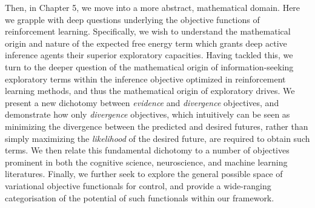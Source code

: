 Then, in Chapter 5, we move into a more abstract, mathematical domain. Here we grapple with deep questions underlying the objective functions of reinforcement learning. Specifically, we wish to understand the mathematical origin and nature of the expected free energy term which grants deep active inference agents their superior exploratory capacities. Having tackled this, we turn to the deeper question of the mathematical origin of information-seeking exploratory terms within the inference objective optimized in reinforcement learning methods, and thus the mathematical origin of exploratory drives. We present a new dichotomy between \emph{evidence} and \emph{divergence} objectives, and demonstrate how only \emph{divergence} objectives, which intuitively can be seen as minimizing the divergence between the predicted and desired futures, rather than simply maximizing the \emph{likelihood} of the desired future, are required to obtain such terms. We then relate this fundamental dichotomy to a number of objectives prominent in both the cognitive science, neuroscience, and machine learning literatures. Finally, we further seek to explore the general possible space of variational objective functionals for control, and provide a wide-ranging categorisation of the potential of such functionals within our framework.


